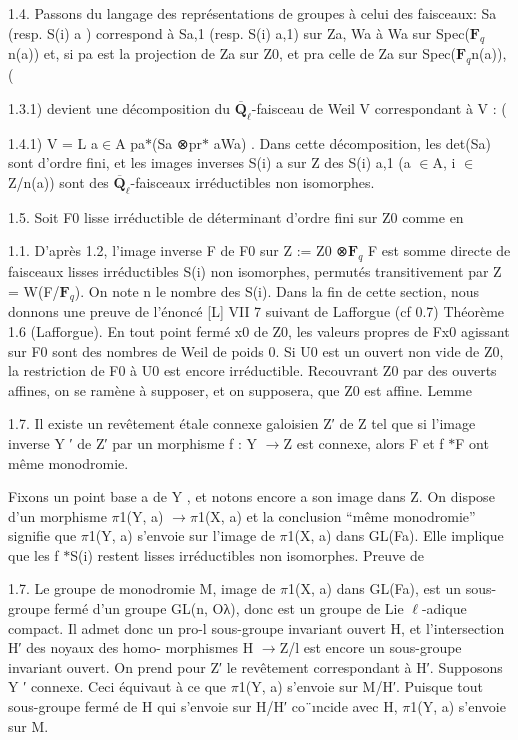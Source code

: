 \documentclass[11pt]{article}
\begin{document}
1.4. Passons du langage des représentations de groupes à celui des faisceaux: Sa (resp. S(i) a ) correspond à Sa,1 (resp. S(i) a,1) sur Za, Wa à Wa sur Spec(\(\mathbf F_q\)n(a)) et, si pa est la projection de Za sur Z0, et pra celle de Za sur Spec(\(\mathbf F_q\)n(a)), (

1.3.1) devient une décomposition du \(\overline{\mathbf Q}_\ell\)-faisceau de Weil V correspondant à V : (

1.4.1) V = L a\(\in\)A pa\(*\)(Sa ⊗pr\(*\) aWa) . Dans cette décomposition, les det(Sa) sont d’ordre fini, et les images inverses S(i) a sur Z des S(i) a,1 (a \(\in\)A, i \(\in\)Z/n(a)) sont des \(\overline{\mathbf Q}_\ell\)-faisceaux irréductibles non isomorphes. 

1.5. Soit F0 lisse irréductible de déterminant d’ordre fini sur Z0 comme en 

1.1. D’après 1.2, l’image inverse F de F0 sur Z := Z0 ⊗\(\mathbf F_q\) F est somme directe de faisceaux lisses irréductibles S(i) non isomorphes, permutés transitivement par Z = W(F/\(\mathbf F_q\)). On note n le nombre des S(i). Dans la fin de cette section, nous donnons une preuve de l’énoncé [L] VII 7 suivant de Lafforgue (cf 0.7) Théorème 1.6 (Lafforgue). En tout point fermé x0 de Z0, les valeurs propres de Fx0 agissant sur F0 sont des nombres de Weil de poids 0. Si U0 est un ouvert non vide de Z0, la restriction de F0 à U0 est encore irréductible. Recouvrant Z0 par des ouverts affines, on se ramène à supposer, et on supposera, que Z0 est affine. Lemme 

1.7. Il existe un revêtement étale connexe galoisien Z′ de Z tel que si l’image inverse Y ′ de Z′ par un morphisme f : Y \(\to\)Z est connexe, alors F et f \(*\)F ont même monodromie.

Fixons un point base a de Y , et notons encore a son image dans Z. On dispose d’un morphisme \(\pi\)1(Y, a) \(\to\)\(\pi\)1(X, a) et la conclusion “même monodromie” signifie que \(\pi\)1(Y, a) s’envoie sur l’image de \(\pi\)1(X, a) dans GL(Fa). Elle implique que les f \(*\)S(i) restent lisses irréductibles non isomorphes. Preuve de 

1.7. Le groupe de monodromie M, image de \(\pi\)1(X, a) dans GL(Fa), est un sous- groupe fermé d’un groupe GL(n, Oλ), donc est un groupe de Lie \(\ell\)-adique compact. Il admet donc un pro-l sous-groupe invariant ouvert H, et l’intersection H′ des noyaux des homo- morphismes H \(\to\)Z/l est encore un sous-groupe invariant ouvert. On prend pour Z′ le revêtement correspondant à H′. Supposons Y ′ connexe. Ceci équivaut à ce que \(\pi\)1(Y, a) s’envoie sur M/H′. Puisque tout sous-groupe fermé de H qui s’envoie sur H/H′ co¨ıncide avec H, \(\pi\)1(Y, a) s’envoie sur M. 
\end{document}
